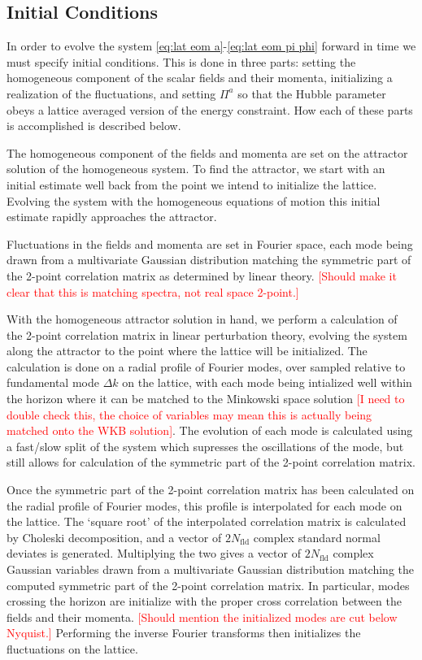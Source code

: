 \subsection{Initial Conditions} \label{sec:ICs}
In order to evolve the system \eqref{eq:lat eom a}-\eqref{eq:lat eom pi phi} forward in time we must specify initial conditions. This is done in three parts: setting the homogeneous component of the scalar fields and their momenta, initializing a realization of the fluctuations, and setting $\Pi^a$ so that the Hubble parameter obeys a lattice averaged version of the energy constraint. How each of these parts is accomplished is described below.

The homogeneous component of the fields and momenta are set on the attractor solution of the homogeneous system. To find the attractor, we start with an initial estimate well back from the point we intend to initialize the lattice. Evolving the system with the homogeneous equations of motion this initial estimate rapidly approaches the attractor.

Fluctuations in the fields and momenta are set in Fourier space, each mode being drawn from a multivariate Gaussian distribution matching the symmetric part of the 2-point correlation matrix as determined by linear theory. \textcolor{red}{[Should make it clear that this is matching spectra, not real space 2-point.]}

With the homogeneous attractor solution in hand, we perform a calculation of the 2-point correlation matrix in linear perturbation theory, evolving the system along the attractor to the point where the lattice will be initialized. The calculation is done on a radial profile of Fourier modes, over sampled relative to fundamental mode $\Delta k$ on the lattice, with each mode being intialized well within the horizon where it can be matched to the Minkowski space solution \textcolor{red}{[I need to double check this, the choice of variables may mean this is actually being matched onto the WKB solution]}. The evolution of each mode is calculated using a fast/slow split of the system which supresses the oscillations of the mode, but still allows for calculation of the symmetric part of the 2-point correlation matrix.

Once the symmetric part of the 2-point correlation matrix has been calculated on the radial profile of Fourier modes, this profile is interpolated for each mode on the lattice. The `square root' of the interpolated correlation matrix is calculated by Choleski decomposition, and a vector of $2N_\mathrm{fld}$ complex standard normal deviates is generated. Multiplying the two gives a vector of $2N_\mathrm{fld}$ complex Gaussian variables drawn from a multivariate Gaussian distribution matching the computed symmetric part of the 2-point correlation matrix. In particular, modes crossing the horizon are initialize with the proper cross correlation between the fields and their momenta. \textcolor{red}{[Should mention the initialized modes are cut below Nyquist.]} Performing the inverse Fourier transforms then initializes the fluctuations on the lattice.

